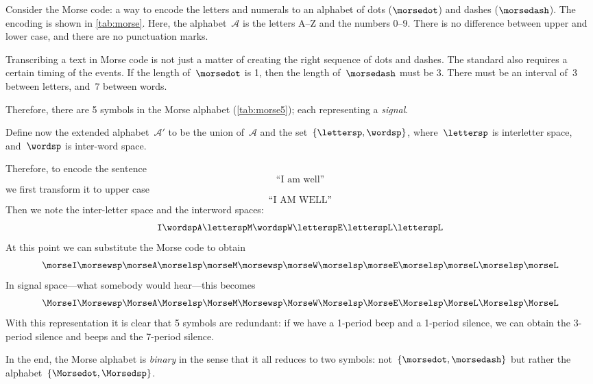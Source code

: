 \begin{example}
  Consider the Morse code: a way to encode the letters and numerals to an alphabet
  of dots ($\morsedot$) and dashes ($\morsedash$). The encoding is shown in \cref{tab:morse}.
  Here, the alphabet~$\mathcal{A}$ is the letters A--Z and the numbers 0--9.
  There is no difference between upper and lower case, and there are no punctuation marks.

  Transcribing a text in Morse code is not just a matter of creating the right sequence of dots and dashes.
  The standard also requires a certain timing of the events.
  If the length of~$\morsedot$ is 1, then the length of~$\morsedash$ must be 3.
  There must be an interval of~$3$ between letters, and~$7$ between words.

  Therefore, there are 5 symbols in the Morse alphabet (\cref{tab:morse5}); each representing a \emph{signal}.


  Define now the extended alphabet~$\mathcal{A}'$ to be the union of~$\mathcal{A}$ and the set~$\{\lettersp, \wordsp\}$, where~$\lettersp$ is interletter space, and~$\wordsp$ is inter-word space.

  Therefore, to encode the sentence
  \begin{equation*}
    \text{``I am well''}
  \end{equation*}
  we first transform it to upper case
  \begin{equation*}
    \text{``I AM WELL''}
  \end{equation*}
  Then we note the inter-letter space and the interword spaces:
  \begin{equation*}
    \texttt{I} \wordsp \texttt{A} \lettersp \texttt{M} \wordsp \texttt{W} \lettersp
    \texttt{E} \lettersp \texttt{L} \lettersp \texttt{L}
  \end{equation*}
  At this point we can substitute the Morse code to obtain
  \begin{equation*}
    \morseI \morsewsp \morseA \morselsp \morseM \morsewsp \morseW \morselsp \morseE \morselsp \morseL \morselsp \morseL
  \end{equation*}
  In signal space---what somebody would hear---this becomes
  \begin{equation*}
    \MorseI \Morsewsp \MorseA \Morselsp \MorseM \Morsewsp \MorseW \Morselsp \MorseE \Morselsp \MorseL \Morselsp \MorseL
  \end{equation*}
  With this representation it is clear that 5 symbols are redundant: if we have a 1-period beep and a 1-period silence, we can obtain the 3-period silence and beeps and the 7-period silence.

  In the end, the Morse alphabet is \emph{binary} in the sense that it all reduces to two symbols: not~$\{\morsedot, \morsedash\}$ but rather the alphabet~$\{\Morsedot, \Morsedsp\}$.
\end{example}

